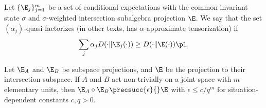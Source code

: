 \begin{definition} \label{def:quasifactorization}
    Let $\{\E_j\}_{j=1}^m$ be a set of conditional expectations with the common invariant state $\sigma$ and $\sigma$-weighted intersection subalgebra projection $\E$. We say that the set $(\alpha_j)$-quasi-factorizes (in other texts, has $\alpha$-approximate tensorization) if
    \begin{equation}
        \sum_j \alpha_j D(\cdot \| \E_j(\cdot)) \geq D(\cdot \| \E(\cdot)) \pl.
    \end{equation}
\end{definition}
\begin{assump} \label{assump:glue} \normalfont
    Let $\E_A$ and $\E_B$ be subspace projections, and $\E$ be the projection to their intersection subspace. If $A$ and $B$ act non-trivially on a joint space with $m$ elementary units, then $\E_A \circ \E_B \precsucc{\epsilon}{} \E$ with $\epsilon \leq c / q^m$ for situation-dependent constants $c, q > 0$.
\end{assump}

